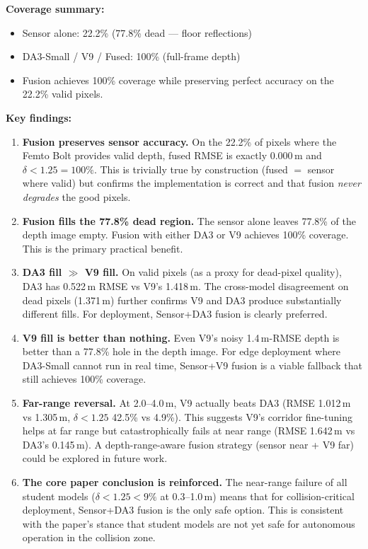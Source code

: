 \documentclass[11pt,a4paper]{article}
\begin{document}
\textbf{Coverage summary:}
\begin{itemize}
  \item Sensor alone: 22.2\% (77.8\% dead --- floor reflections)
  \item DA3-Small / V9 / Fused: 100\% (full-frame depth)
  \item Fusion achieves 100\% coverage while preserving perfect
    accuracy on the 22.2\% valid pixels.
\end{itemize}

\textbf{Key findings:}

\begin{enumerate}
  \item \textbf{Fusion preserves sensor accuracy.}  On the 22.2\% of
    pixels where the Femto Bolt provides valid depth, fused RMSE is
    exactly 0.000\,m and $\delta{<}1.25 = 100\%$.  This is trivially
    true by construction (fused $=$ sensor where valid) but confirms
    the implementation is correct and that fusion \emph{never degrades}
    the good pixels.

  \item \textbf{Fusion fills the 77.8\% dead region.}  The sensor
    alone leaves 77.8\% of the depth image empty.  Fusion with either
    DA3 or V9 achieves 100\% coverage.  This is the primary practical
    benefit.

  \item \textbf{DA3 fill $\gg$ V9 fill.}  On valid pixels (as a proxy
    for dead-pixel quality), DA3 has 0.522\,m RMSE vs V9's 1.418\,m.
    The cross-model disagreement on dead pixels (1.371\,m) further
    confirms V9 and DA3 produce substantially different fills.  For
    deployment, Sensor+DA3 fusion is clearly preferred.

  \item \textbf{V9 fill is better than nothing.}  Even V9's noisy
    1.4\,m-RMSE depth is better than a 77.8\% hole in the depth image.
    For edge deployment where DA3-Small cannot run in real time,
    Sensor+V9 fusion is a viable fallback that still achieves 100\%
    coverage.

  \item \textbf{Far-range reversal.}  At 2.0--4.0\,m, V9 actually
    beats DA3 (RMSE 1.012\,m vs 1.305\,m, $\delta{<}1.25$ 42.5\% vs
    4.9\%).  This suggests V9's corridor fine-tuning helps at far
    range but catastrophically fails at near range (RMSE 1.642\,m
    vs DA3's 0.145\,m).  A depth-range-aware fusion strategy
    (sensor near + V9 far) could be explored in future work.

  \item \textbf{The core paper conclusion is reinforced.}  The
    near-range failure of all student models ($\delta{<}1.25 < 9\%$
    at 0.3--1.0\,m) means that for collision-critical deployment,
    Sensor+DA3 fusion is the only safe option.  This is consistent
    with the paper's stance that student models are not yet safe for
    autonomous operation in the collision zone.
\end{enumerate}
\end{document}
